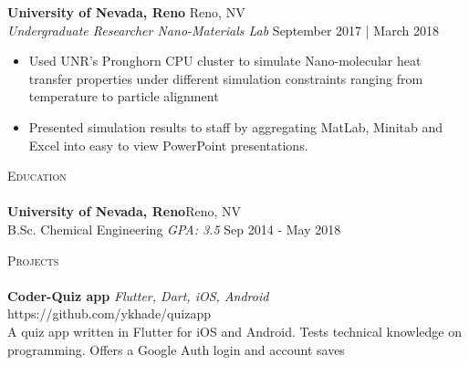\documentclass[a4paper]{article}
\newcommand{\lineunder} {
    \vspace*{-8pt} \\
    \hspace*{-18pt} \hrulefill \\
}
\newcommand{\header} [1] {
    {\hspace*{-18pt}\vspace*{6pt} \textsc{#1}}
    \vspace*{-6pt} \lineunder
}
\newcommand{\lineunder} {
    \vspace*{-8pt} \\
    \hspace*{-18pt} \hrulefill \\
}
\newcommand{\header} [1] {
    {\hspace*{-18pt}\vspace*{6pt} \textsc{#1}}
    \vspace*{-6pt} \lineunder
}
\begin{document}
\textbf{University of Nevada, Reno} \hfill Reno, NV\\
\textit{Undergraduate Researcher \textbar{} Nano-Materials Lab} \hfill September 2017 | March 2018\\
\vspace{-1mm}
\begin{itemize} \itemsep 1pt
	\item Used UNR’s Pronghorn CPU cluster to simulate Nano-molecular heat transfer properties under different simulation constraints ranging from temperature to particle alignment
	\item Presented simulation results to staff by aggregating MatLab, Minitab and Excel into easy to view PowerPoint presentations.
\end{itemize}



\header{Education}
\textbf{University of Nevada, Reno}\hfill Reno, NV\\
B.Sc. Chemical Engineering \textit{GPA: 3.5} \hfill Sep 2014 - May 2018\\
\vspace{2mm}

\header{Projects}
{\textbf{Coder-Quiz app}} {\sl Flutter, Dart, iOS, Android} \hfill https://github.com/ykhade/quizapp\\
A quiz app written in Flutter for iOS and Android. Tests technical knowledge on programming. Offers a Google Auth login and account saves\\
\vspace*{2mm}




\ 
\end{document}
